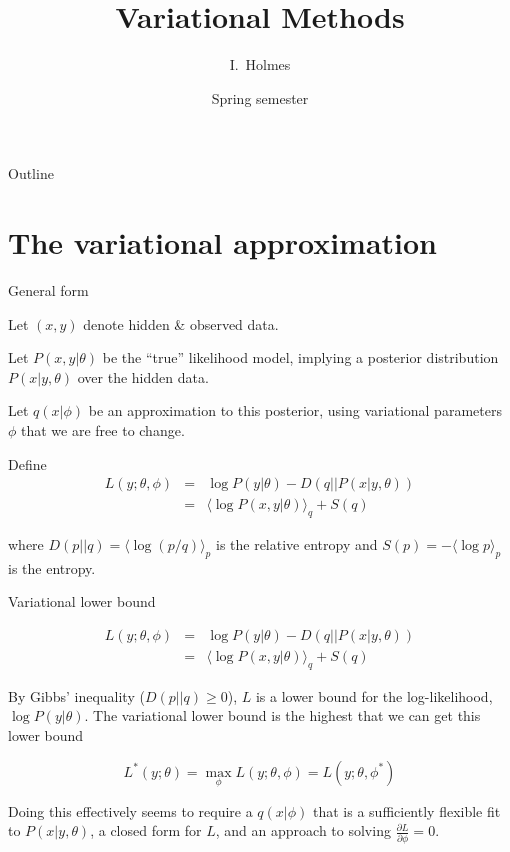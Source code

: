\documentclass{beamer}
\title[Variational] %
{Variational Methods}
\author%
{I.~Holmes} %
\institute[University of California, Berkeley] %
{
  Department of Bioengineering\\
  University of California, Berkeley}
\date%
{Spring semester}
\begin{document}
\begin{frame}
  \titlepage
\end{frame}

\begin{frame}{Outline}
  \tableofcontents
\end{frame}

\section{The variational approximation}

\begin{frame}{General form}

Let $(x,y)$ denote hidden \& observed data.

Let $P(x,y|\theta)$ be the ``true'' likelihood model,
implying a posterior distribution $P(x|y,\theta)$ over the hidden data.

Let $q(x|\phi)$ be an approximation to this posterior,
using variational parameters $\phi$
that we are free to change.

Define
\begin{eqnarray*}
L(y;\theta,\phi) & = & \log P(y|\theta) - D\left(q||P(x|y,\theta)\right) \\
& = & \langle \log P(x,y|\theta) \rangle_q + S\left( q \right)
\end{eqnarray*}

where $D(p||q) = \langle \log (p/q) \rangle_p$ is the relative entropy
and $S(p) = -\langle \log p \rangle_p$ is the entropy.

\end{frame}


\begin{frame}{Variational lower bound}

\begin{eqnarray*}
L(y;\theta,\phi) & = & \log P(y|\theta) - D\left(q||P(x|y,\theta)\right) \\
& = & \langle \log P(x,y|\theta) \rangle_q + S\left( q \right)
\end{eqnarray*}

By Gibbs' inequality ($D(p||q) \geq 0$), $L$ is a lower bound for the log-likelihood, $\log P(y|\theta)$.
The variational lower bound is the highest that we can get this lower bound

\[
L^\ast(y;\theta) = \max_{\phi} L(y;\theta,\phi) = L(y;\theta,\phi^\ast)
\]

Doing this effectively seems to require
 a $q(x|\phi)$ that is a sufficiently flexible fit to $P(x|y,\theta)$,
 a closed form for $L$,
 and an approach to solving $\frac{\partial{L}}{\partial{\phi}} = 0$.

\end{frame}
\end{document}

